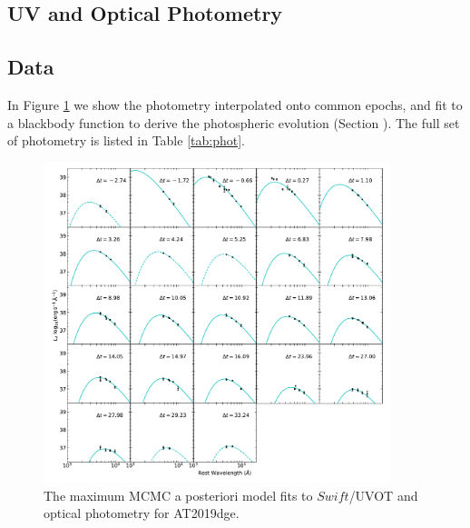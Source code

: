 \documentclass[twocolumn]{aastex63}
\begin{document}
\begin{CJK*}{UTF8}{gbsn}

\clearpage
\appendix

\section{UV and Optical Photometry} \label{app:phot}
\subsection{Data}
In Figure \ref{fig:seds} we show the photometry interpolated onto common epochs, and fit to a blackbody function to derive the photospheric evolution (Section ). The full set of photometry is listed in Table \ref{tab:phot}.
\begin{figure}
    \centering
    \includegraphics[width = 0.9\textwidth]{figures/seds.pdf}
    \caption{The maximum MCMC a posteriori model fits to $Swift$/UVOT and optical photometry for 
    AT2019dge.  \label{fig:seds}}
\end{figure}




\end{CJK*}
\end{document}

